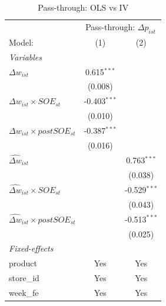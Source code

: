 
\begin{table}[htbp]
   \caption{\label{tab:iv_passthrough} Pass-through: OLS vs IV}
   \centering
   \begin{tabular}{lcc}
      \tabularnewline \midrule \midrule
       & \multicolumn{2}{c}{Pass-through: $\Delta p_{ist}$} \\ 
      Model:                                                     & (1)            & (2)\\  
      \midrule
      \emph{Variables}\\
      $\Delta w_{ist}$                                           & 0.615$^{***}$  &   \\   
                                                                 & (0.008)        &   \\   
      $\Delta w_{ist} \times SOE_{st}$                           & -0.403$^{***}$ &   \\   
                                                                 & (0.010)        &   \\   
      $\Delta w_{ist} \times postSOE_{st}$                       & -0.387$^{***}$ &   \\   
                                                                 & (0.016)        &   \\   
      $\widehat{\Delta w}_{ist}$                                 &                & 0.763$^{***}$\\   
                                                                 &                & (0.038)\\   
      $\widehat{\Delta w}_{ist} \times SOE_{st}$                 &                & -0.529$^{***}$\\   
                                                                 &                & (0.043)\\   
      $\widehat{\Delta w}_{ist} \times postSOE_{st}$             &                & -0.513$^{***}$\\   
                                                                 &                & (0.025)\\   
      \midrule
      \emph{Fixed-effects}\\
      product                                                    & Yes            & Yes\\  
      store\_id                                                  & Yes            & Yes\\  
      week\_fe                                                   & Yes            & Yes\\  

\end{tabular}
\end{table}
